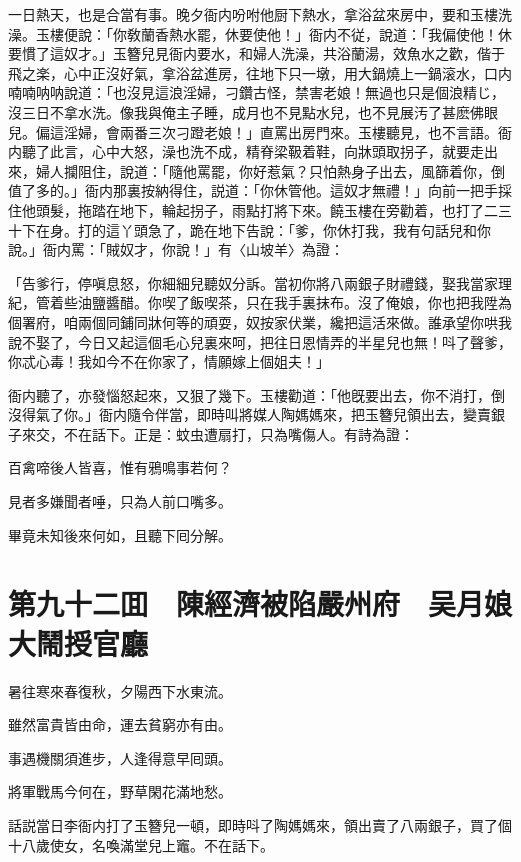 一日熱天，也是合當有事。晚夕衙内吩咐他厨下熱水，拿浴盆來房中，要和玉樓洗澡。玉樓便說：「你敎蘭香熱水罷，休要使他！」衙内不従，說道：「我偏使他！休要慣了這奴才。」玉簪兒見衙内要水，和婦人洗澡，共浴蘭湯，效魚水之歡，偕于飛之楽，心中正沒好氣，拿浴盆進房，往地下只一墩，用大鍋燒上一鍋滚水，口内喃喃呐呐說道：「也沒見這浪淫婦，刁鑽古怪，禁害老娘！無過也只是個浪精じ，沒三日不拿水洗。像我與俺主子睡，成月也不見點水兒，也不見展汚了甚麽佛眼兒。偏這淫婦，會兩番三次刁蹬老娘！」直罵出房門來。玉樓聽見，也不言語。衙内聽了此言，心中大怒，澡也洗不成，精脊梁靸着鞋，向牀頭取拐子，就要走出來，婦人攔阻住，說道：「隨他罵罷，你好惹氣？只怕熱身子出去，風篩着你，倒值了多的。」衙内那裏按納得住，説道：「你休管他。這奴才無禮！」向前一把手採住他頭髮，拖踏在地下，輪起拐子，雨點打將下來。饒玉樓在旁勸着，也打了二三十下在身。打的這丫頭急了，跪在地下告說：「爹，你休打我，我有句話兒和你說。」衙内罵：「賊奴才，你說！」有〈山坡羊〉為證：

「告爹行，停嗔息怒，你細細兒聽奴分訴。當初你將八兩銀子財禮錢，娶我當家理紀，管着些油鹽醬醋。你喫了飯喫茶，只在我手裏抹布。沒了俺娘，你也把我陞為個署府，咱兩個同鋪同牀何等的頑耍，奴按家伏業，纔把這活來做。誰承望你哄我說不娶了，今日又起這個毛心兒裏來呵，把往日恩情弄的半星兒也無！呌了聲爹，你忒心毒！我如今不在你家了，情願嫁上個姐夫！」

衙内聽了，亦發惱怒起來，又狠了幾下。玉樓勸道：「他旣要出去，你不消打，倒沒得氣了你。」衙内隨令伴當，即時叫將媒人陶媽媽來，把玉簪兒領出去，變賣銀子來交，不在話下。正是：蚊虫遭扇打，只為嘴傷人。有詩為證：

百禽啼後人皆喜，惟有鴉鳴事若何？

見者多嫌聞者唾，只為人前口嘴多。

畢竟未知後來何如，且聽下囘分解。

\chapter*{第九十二囬　陳經濟被陷嚴州府　吴月娘大鬧授官廳}

暑往寒來春復秋，夕陽西下水東流。

雖然富貴皆由命，運去貧窮亦有由。

事遇機關須進步，人逢得意早囘頭。

將軍戰馬今何在，野草閑花滿地愁。

話説當日李衙内打了玉簪兒一頓，即時呌了陶媽媽來，領出賣了八兩銀子，買了個十八歲使女，名喚滿堂兒上竈。不在話下。


